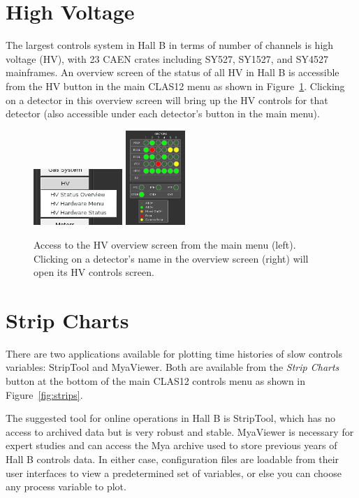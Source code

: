 \documentclass[amsmath,amssymb,notitlepage,11pt]{revtex4}
\begin{document}
\clearpage

\section{High Voltage}
The largest controls system in Hall B in terms of number of channels is high voltage (HV), with 23 CAEN crates including SY527, SY1527, and SY4527 mainframes.  An overview screen of the status of all HV in Hall B is accessible from the HV button in the main CLAS12 menu as shown in Figure~\ref{fig:hv}.  Clicking on a detector in this overview screen will bring up the HV controls for that detector (also accessible under each detector's button in the main menu).

\begin{figure}[htbp]\centering
  \includegraphics[width=0.3\textwidth]{pics/hvmenu}
  \includegraphics[width=0.2\textwidth]{pics/hvstat}
  \caption{Access to the HV overview screen from the main menu (left).  Clicking on a detector's name in the overview screen (right) will open its HV controls screen.\label{fig:hv}}
\end{figure}


\section{Strip Charts}
There are two applications available for plotting time histories of slow controls variables:  StripTool and MyaViewer.  Both are available from the {\em Strip Charts} button at the bottom of the main CLAS12 controls menu as shown in Figure~\ref{fig:strips}.

The suggested tool for online operations in Hall B is StripTool, which has no access to archived data but is very robust and stable.  MyaViewer is necessary for expert studies and can access the Mya archive used to store previous years of Hall B controls data.  In either case, configuration files are loadable from their user interfaces to view a predetermined set of variables, or else you can choose any process variable to plot.
\end{document}
